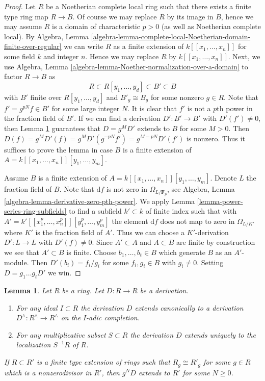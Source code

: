 \documentclass{amsart}
\theoremstyle{plain}
\newtheorem{lemma}[subsection]{Lemma}
\theoremstyle{definition}
\theoremstyle{remark}
\numberwithin{equation}{subsection}
\begin{document}
\begin{proof}
Let $R$ be a Noetherian complete local ring such that there exists
a finite type ring map $R \to B$. Of course we may replace $R$ by
its image in $B$, hence we may assume $R$ is a domain of characteristic
$p > 0$ (as well as Noetherian complete local). By Algebra, Lemma
\ref{algebra-lemma-complete-local-Noetherian-domain-finite-over-regular}
we can write $R$ as a finite extension of $k[[x_1, \ldots, x_n]]$ for some
field $k$ and integer $n$. Hence we may replace $R$ by $k[[x_1, \ldots, x_n]]$.
Next, we use
Algebra, Lemma \ref{algebra-lemma-Noether-normalization-over-a-domain}
to factor $R \to B$ as
$$
R \subset R[y_1, \ldots, y_d] \subset B' \subset B
$$
with $B'$ finite over $R[y_1, \ldots, y_d]$ and $B'_g \cong B_g$
for some nonzero $g \in R$. Note that $f' = g^{pN} f \in B'$ for some
large integer $N$. It is clear that $f'$ is not a $p$th power in
the fraction field of $B'$. If we can find a derivation
$D' : B' \to B'$ with $D'(f') \not = 0$, then
Lemma \ref{lemma-derivation-extends}
guarantees that $D = g^MD'$ extends to $B$ for some $M > 0$. Then
$D(f) = g^MD'(f) = g^MD'(g^{-pN}f') = g^{M - pN}D'(f')$ is nonzero.
Thus it suffices to prove the lemma in case
$B$ is a finite extension of $A = k[[x_1, \ldots, x_n]][y_1, \ldots, y_m]$.

\medskip\noindent
Assume $B$ is a finite extension of
$A = k[[x_1, \ldots, x_n]][y_1, \ldots, y_m]$.
Denote $L$ the fraction field of $B$.
Note that $\text{d}f$ is not zero in $\Omega_{L/\mathbf{F}_p}$, see
Algebra, Lemma \ref{algebra-lemma-derivative-zero-pth-power}.
We apply Lemma \ref{lemma-power-series-ring-subfields} to find a subfield
$k' \subset k$ of finite index such that with
$A' = k'[[x_1^p, \ldots, x_n^p]][y_1^p, \ldots, y_m^p]$
the element $\text{d}f$ does not map to zero in $\Omega_{L/K'}$
where $K'$ is the fraction field of $A'$.
Thus we can choose a $K'$-derivation $D' : L \to L$
with $D'(f) \not = 0$. Since $A' \subset A$ and $A \subset B$ are
finite by construction we see that $A' \subset B$ is finite.
Choose $b_1, \ldots, b_t \in B$ which generate $B$ as an $A'$-module.
Then $D'(b_i) = f_i/g_i$ for some $f_i, g_i \in B$ with $g_i \not = 0$.
Setting $D = g_1 \ldots g_t D'$ we win.
\end{proof}


\begin{lemma}
\label{lemma-derivation-extends}
Let $R$ be a ring. Let $D : R \to R$ be a derivation.
\begin{enumerate}
\item For any ideal $I \subset R$ the derivation $D$ extends
canonically to a derivation $D^\wedge : R^\wedge \to R^\wedge$
on the $I$-adic completion.
\item For any multiplicative subset $S \subset R$ the derivation
$D$ extends uniquely to the localization $S^{-1}R$ of $R$.
\end{enumerate}
If $R \subset R'$ is a finite type extension of rings such that
$R_g \cong R'_g$ for some $g \in R$ which is a nonzerodivisor in $R'$,
then $g^ND$ extends to $R'$ for some $N \geq 0$.
\end{lemma}
\end{document}
